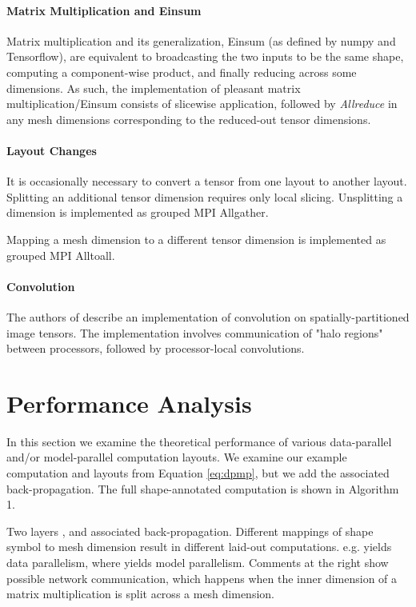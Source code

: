 \documentclass{article}
\begin{document}
\begin{itemize}
\paragraph{Matrix Multiplication and Einsum} 

Matrix multiplication and its generalization, Einsum (as defined by numpy and Tensorflow), are equivalent to broadcasting the two inputs to be the same shape, computing a component-wise product, and finally reducing across some dimensions.  As such, the implementation of pleasant matrix multiplication/Einsum consists of slicewise application, followed by \textit{Allreduce} in any mesh dimensions corresponding to the reduced-out tensor dimensions.







\paragraph{Layout Changes}
It is occasionally necessary to convert a tensor from one layout to another layout.  Splitting an additional tensor dimension requires only local slicing.  Unsplitting a dimension is implemented as grouped MPI Allgather.

Mapping a mesh dimension to a different tensor dimension is implemented as grouped MPI Alltoall.


\paragraph{Convolution}
The authors of \cite{Jin18} describe an implementation of convolution on spatially-partitioned image tensors.  The implementation involves communication of  "halo regions" between processors, followed by processor-local convolutions.

\section{Performance Analysis} \label{sec:performance}

In this section we examine the theoretical performance of various data-parallel and/or model-parallel computation layouts.  We examine our example computation and layouts from Equation \ref{eq:dpmp}, but we add the associated back-propagation.  The full shape-annotated computation is shown in Algorithm 1.  

\begin{algorithm}[h!]
\caption{Two layers , and associated back-propagation.  Different mappings of shape symbol to mesh dimension result in different laid-out computations. e.g.  yields data parallelism, where  yields model parallelism.
Comments at the right show possible network communication, which happens when the inner dimension of a matrix multiplication is split across a mesh dimension.}
\begin{algorithmic}[1]


\end{algorithmic}
\end{algorithm}
\end{itemize}
\end{document}
